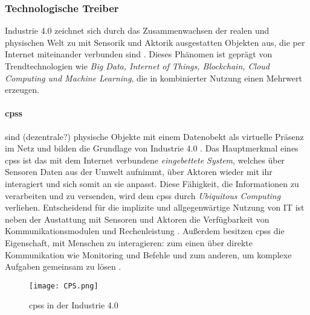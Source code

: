 \subsubsection{Technologische Treiber}

Industrie 4.0 zeichnet sich durch das Zusammenwachsen der realen und physischen Welt zu mit Sensorik und Aktorik ausgestatten Objekten aus, die per Internet miteinander verbunden sind \citep{BITKOM2015}. Dieses Phänomen ist geprägt von Trendtechnologien wie \textit{Big Data, Internet of Things, Blockchain, Cloud Computing und Machine Learning}, die in kombinierter Nutzung einen Mehrwert erzeugen.
\paragraph{\acf{cpss}}
sind (dezentrale?) physische Objekte mit einem Datenobekt als virtuelle Präsenz im Netz und bilden die Grundlage von Industrie 4.0 \citep{Drath2016}. Das Hauptmerkmal eines \ac{cpss} ist das mit dem Internet verbundene \textit{eingebettete System}, welches über Sensoren Daten aus der Umwelt aufnimmt, über Aktoren wieder mit ihr interagiert und sich somit an sie anpasst. Diese Fähigkeit, die Informationen zu verarbeiten und zu versenden, wird dem \ac{cpss} durch \textit{Ubiquitous Computing} verliehen. Entscheidend für die implizite und allgegenwärtige Nutzung von IT  ist neben der Austattung mit Sensoren und Aktoren die Verfügbarkeit von Kommunikationsmodulen und Rechenleistung \citep{Roth2016}.  Außerdem besitzen \ac{cpss} die Eigenschaft, mit Menschen zu interagieren: zum einen über direkte Kommunikation wie Monitoring und Befehle und zum anderen, um komplexe Aufgaben gemeinsam zu lösen \citep{Lueth2016}.


\begin{figure}[ht]
  \centering
  \texttt{[image: CPS.png]}
  \caption[Cyber-physische Systeme in der Industrie 4.0]{\ac{cpss} in der Industrie 4.0 \citep[S. 30]{Roth2016}}
  \label{}
\end{figure}

